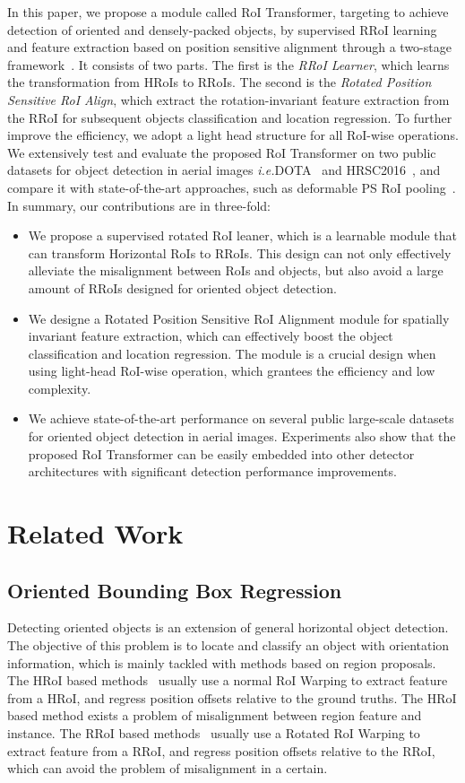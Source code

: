\documentclass[11pt,onecolumn]{article}         \usepackage[top=3.6cm, bottom=3.2cm, left=2.3cm, right=2.3cm]{geometry}
\newcommand{\ie}{\emph{i.e.}}
\begin{document}
In this paper, we propose a module called RoI Transformer, targeting to achieve detection of oriented and densely-packed objects, by supervised RRoI learning and feature extraction based on position sensitive alignment through a two-stage framework~\cite{r-cnn,Fast_RCNN,FasterR-CNN,R-FCN,MaskRCNN}. 
It consists of two parts. The first is the {\em RRoI Learner}, which learns the transformation from HRoIs to RRoIs. The second is the {\em Rotated Position Sensitive RoI Align}, which extract the rotation-invariant feature extraction from the RRoI for subsequent objects classification and location regression.
To further improve the efficiency, we adopt a light head structure for all RoI-wise operations. 
We extensively test and evaluate the proposed RoI Transformer on two public datasets for object detection in aerial images \ie DOTA~\cite{DOTA} and HRSC2016~\cite{HRSC2016}, and compare it with state-of-the-art approaches, such as deformable PS RoI pooling~\cite{Deformable}. 
In summary, our contributions are in three-fold:
\begin{itemize}
    \item We propose a supervised rotated RoI leaner, which is a learnable module that can transform Horizontal RoIs to RRoIs. This design can not only effectively alleviate the misalignment between RoIs and objects, but also avoid a large amount of RRoIs designed for oriented object detection. 
\item We designe a Rotated Position Sensitive RoI Alignment module for spatially invariant feature extraction, which can effectively boost the object classification and location regression. The module is a crucial design when using light-head RoI-wise operation, which grantees the efficiency and low complexity. 
\item We achieve state-of-the-art performance on several public large-scale datasets for oriented object detection in aerial images. Experiments also show that the proposed RoI Transformer can be easily embedded into other detector architectures with significant detection performance improvements.
\end{itemize}
\section{Related Work}
\subsection{Oriented Bounding Box Regression}
Detecting oriented objects is an extension of general horizontal object detection. 
The objective of this problem is to locate and classify an object with orientation information, which is mainly tackled with methods based on region proposals. 
The HRoI based methods~\cite{R2CNN, DOTA} usually use a normal RoI Warping to extract feature from a HRoI, and regress position offsets relative to the ground truths. The HRoI based method exists a problem of misalignment between region feature and instance. The RRoI based methods~\cite{RRPN, RRCNN} usually use a Rotated RoI Warping to extract feature from a RRoI, and regress position offsets relative to the RRoI, which can avoid the problem of misalignment in a certain. 
\end{document}
